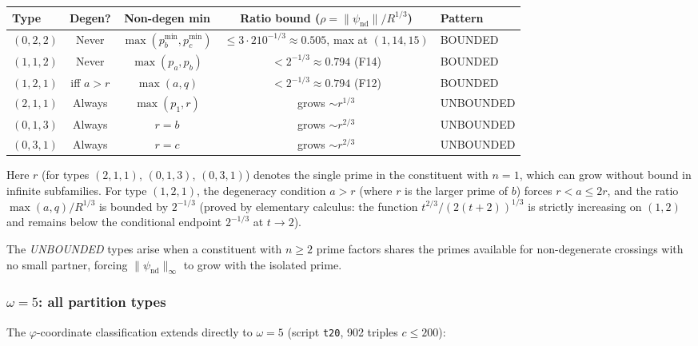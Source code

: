 \documentclass[12pt]{article}
\theoremstyle{definition}
\begin{document}
\begin{center}
\footnotesize\begin{tabular}{lcccl}
\hline
Type & Degen? & Non-degen min & Ratio bound ($\rho = \|\psi_\mathrm{nd}\|/R^{1/3}$) & Pattern \\
\hline
$(0,2,2)$ & Never & $\max(p_b^{\min}, p_c^{\min})$ &
  $\le 3\cdot 210^{-1/3}\approx 0.505$, max at $(1,14,15)$ & BOUNDED \\
$(1,1,2)$ & Never & $\max(p_a, p_b)$ & $<2^{-1/3} \approx 0.794$ (F14) & BOUNDED \\
$(1,2,1)$ & iff $a > r$ & $\max(a, q)$ & $<2^{-1/3} \approx 0.794$ (F12) & BOUNDED \\
$(2,1,1)$ & Always & $\max(p_1, r)$ & grows $\sim r^{1/3}$ & UNBOUNDED \\
$(0,1,3)$ & Always & $r = b$ & grows $\sim r^{2/3}$ & UNBOUNDED \\
$(0,3,1)$ & Always & $r = c$ & grows $\sim r^{2/3}$ & UNBOUNDED \\
\hline
\end{tabular}
\end{center}

\noindent
Here $r$ (for types $(2,1,1)$, $(0,1,3)$, $(0,3,1)$) denotes the single prime in the
constituent with $n = 1$, which can grow without bound in infinite subfamilies.
For type $(1,2,1)$, the degeneracy condition $a > r$ (where $r$ is the larger prime of $b$)
forces $r < a \le 2r$, and the ratio $\max(a,q)/R^{1/3}$ is bounded by $2^{-1/3}$
(proved by elementary calculus: the function $t^{2/3}/(2(t+2))^{1/3}$ is
strictly increasing on $(1,2)$ and remains below the conditional endpoint
$2^{-1/3}$ at $t\to2$).

The \emph{UNBOUNDED} types arise when a constituent with $n \ge 2$ prime factors shares
the primes available for non-degenerate crossings with no small partner, forcing
$\|\psi_{\text{nd}}\|_\infty$ to grow with the isolated prime.

\subsubsection*{$\omega = 5$: all partition types}

The $\varphi$-coordinate classification extends directly to $\omega = 5$
(script \texttt{t20}, 902 triples $c \le 200$):
\end{document}
